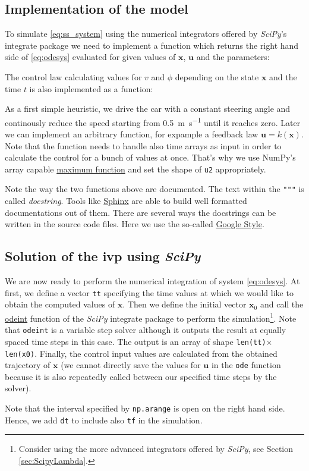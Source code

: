 \documentclass[a4paper,11pt,headings=standardclasses,parskip=half]{scrartcl}
\newcommand{\listcode}[3]{}
\newcommand{\listcodeplot}[2]{\listcode{#1}{#2}{../sim/01_car_example_plotting.py}}
\newcommand{\scipy}{\emph{SciPy}\xspace}
\newcommand{\uu}{\mathbf{u}}
\newcommand{\x}{\mathbf{x}}
\newcommand{\xZero}{\mathbf{x}_0}
\begin{document}
\subsection{Implementation of the model} \label{sec:implementation-model}
To simulate \eqref{eq:ss_system} using the numerical integrators offered by \scipy's integrate package we need to implement a function which returns the right hand side of \eqref{eq:odesys} evaluated for given values of $\x$, $\uu$ and the parameters:
\listcodeplot{24}{44}
The control law calculating values for $v$ and $\phi$ depending on the state $\x$ and the time $t$ is also implemented as a function:
\listcodeplot{47}{60}
As a first simple heuristic, we drive the car with a constant steering angle and continously reduce the speed starting from \SI{0.5}{\meter\per\second} until it reaches zero. Later we can implement an arbitrary function, for expample a feedback law $\uu=k(\x)$. Note that the function needs to handle also time arrays as input in order to calculate the control for a bunch of values at once. That's why we use NumPy's array capable \href{https://docs.scipy.org/doc/numpy/reference/generated/numpy.maximum.html}{maximum function} and set the shape of \texttt{u2} appropriately.

Note the way the two functions above are documented. The text within the \texttt{"""} is called \emph{docstring}. Tools like \href{http://www.sphinx-doc.org/en/stable/}{Sphinx} are able to build well formatted documentations out of them. There are several ways the docstrings can be written in the source code files. Here we use the so-called \href{https://sphinxcontrib-napoleon.readthedocs.io/en/latest/example_google.html}{Google Style}.

\subsection{Solution of the \gls{ivp} using \scipy}
We are now ready to perform the numerical integration of system \eqref{eq:odesys}. At first, we define a vector \texttt{tt} specifying the time values at which we would like to obtain the computed values of $\x$. Then we define the initial vector $\xZero$ and call the  \href{https://docs.scipy.org/doc/scipy/reference/generated/scipy.integrate.odeint.html}{odeint} function of the \scipy integrate package to perform the simulation\footnote{Consider using the more advanced integrators offered by \scipy, see Section \ref{sec:ScipyLambda}.}. Note that \texttt{odeint} is a variable step solver although it outputs the result at equally spaced time steps in this case. The output is an array of shape \texttt{len(tt)}$\times$\texttt{len(x0)}. Finally, the control input values are calculated from the obtained trajectory of $\x$ (we cannot directly save the values for $\uu$ in the \texttt{ode} function because it is also repeatedly called between our specified time steps by the solver).
\listcodeplot{135}{143}
Note that the interval specified by \texttt{np.arange} is open on the right hand side. Hence, we add \texttt{dt} to include also \texttt{tf} in the simulation. 
\end{document}
